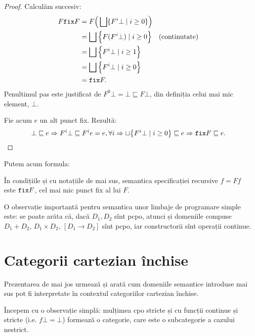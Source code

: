 \documentclass[12pt, a4paper]{article}
\begin{document}
\begin{proof}
  Calculăm succesiv:
  \begin{align*}
    F \texttt{fix} F &= F \Big( \bigsqcup \{ F^i \bot \mid i \geq 0 \} \Big) \\
                   &= \bigsqcup \Big\{ F(F^i \bot) \mid i \geq 0 \Big\} \quad \text{(continutate)} \\
                   &= \bigsqcup \Big\{ F^i \bot \mid i \geq 1 \Big\} \\
                   &= \bigsqcup \Big\{ F^i \bot \mid i \geq 0 \Big\} \\
                   &= \texttt{fix} F.
  \end{align*}
  Penultimul pas este justificat de $ F^0 \bot = \bot \sqsubseteq F \bot $, din definiția celui
  mai mic element, $ \bot $.

  Fie acum $ e $ un alt punct fix. Rezultă:
  \[
    \bot \sqsubseteq e \Rightarrow F^i \bot \sqsubseteq F^i e = e, \forall i \Rightarrow %
    \sqcup \big\{ F^i \bot \mid i \geq 0 \big\} \sqsubseteq e \Rightarrow \code{fix} F \sqsubseteq e.
  \]
\end{proof}

Putem acum formula:

\begin{definition}\label{def:semfix}
  În condițiile și cu notațiile de mai sus, semantica specificației recursive $ f = Ff $
  este $ \texttt{fix} F $, cel mai mic punct fix al lui $ F $.
\end{definition}

O observație importantă pentru semantica unor limbaje de programare simple este:
se poate arăta că, dacă $ D_1, D_2 $ sînt pcpo, atunci și domeniile compuse $ D_1 + D_2 $,
$ D_1 \times D_2 $, $ [D_1 \to D_2] $ sînt pcpo, iar constructorii sînt operații continue.


\section{Categorii cartezian închise}
\label{sec:ccc}

\indent\indent Prezentarea de mai jos urmează \cite{bw} și arată cum domeniile semantice
introduse mai sus pot fi interpretate în contextul categoriilor cartezian
închise.

Începem cu o observație simplă: mulțimea cpo stricte și cu funcții continue
și stricte (i.e. $ f\bot = \bot $) formează o categorie, care este o subcategorie
a cazului nestrict.
\end{document}

